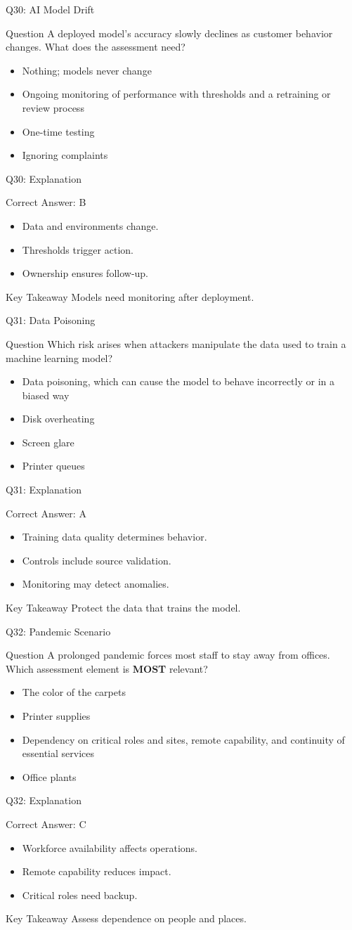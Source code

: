 \documentclass[aspectratio=169]{beamer}
\newcommand{\hq}[7]{%
	\begin{frame}{Q#1: #2}
		\begin{block}{Question}
			#3
		\end{block}
		\begin{itemize}
			#4
		\end{itemize}
	\end{frame}
	\begin{frame}{Q#1: Explanation}
		\begin{block}{Correct Answer: #5}
			\begin{itemize}
				#6
			\end{itemize}
		\end{block}
		\begin{alertblock}{Key Takeaway}
			#7
		\end{alertblock}
	\end{frame}
}
\begin{document}
	\hq{30}{AI Model Drift}
	{A deployed model's accuracy slowly declines as customer behavior changes. What does the assessment need?}
	{\item[\textbf{(A)}] Nothing; models never change
		\item[\textbf{(B)}] Ongoing monitoring of performance with thresholds and a retraining or review process
		\item[\textbf{(C)}] One-time testing
		\item[\textbf{(D)}] Ignoring complaints}
	{B}
	{\item Data and environments change.
		\item Thresholds trigger action.
		\item Ownership ensures follow-up.}
	{Models need monitoring after deployment.}

	\hq{31}{Data Poisoning}
	{Which risk arises when attackers manipulate the data used to train a machine learning model?}
	{\item[\textbf{(A)}] Data poisoning, which can cause the model to behave incorrectly or in a biased way
		\item[\textbf{(B)}] Disk overheating
		\item[\textbf{(C)}] Screen glare
		\item[\textbf{(D)}] Printer queues}
	{A}
	{\item Training data quality determines behavior.
		\item Controls include source validation.
		\item Monitoring may detect anomalies.}
	{Protect the data that trains the model.}

	\hq{32}{Pandemic Scenario}
	{A prolonged pandemic forces most staff to stay away from offices. Which assessment element is \textbf{MOST} relevant?}
	{\item[\textbf{(A)}] The color of the carpets
		\item[\textbf{(B)}] Printer supplies
		\item[\textbf{(C)}] Dependency on critical roles and sites, remote capability, and continuity of essential services
		\item[\textbf{(D)}] Office plants}
	{C}
	{\item Workforce availability affects operations.
		\item Remote capability reduces impact.
		\item Critical roles need backup.}
	{Assess dependence on people and places.}
\end{document}
